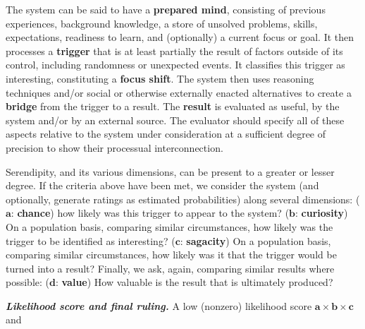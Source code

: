 
\begin{description}[itemsep=16pt]
\item[{(\textbf{A - Definitional characteristics})}] {The system can
  be said to have a {\textbf{prepared mind}}, consisting of previous
  experiences, background knowledge, a store of unsolved problems,
  skills, expectations, readiness to learn, and (optionally) a current
  focus or goal.  It then processes a {\textbf{trigger}} that is at
  least partially the result of factors outside of its control,
  including randomness or unexpected events.  It classifies this
  trigger as interesting, constituting a {\textbf{focus shift}}.  The
  system then uses reasoning techniques and/or social or otherwise
  externally enacted alternatives to create a {\textbf{bridge}} from
  the trigger to a result.  The {\textbf{result}} is evaluated as
  useful, by the system and/or by an external source.}  The evaluator
  should specify all of these aspects relative to the system under
  consideration at a sufficient degree of precision to show their
  processual interconnection.
\item[{(\textbf{B - Dimensions})}] {Serendipity, and its various
  dimensions, can be present to a greater or lesser degree.  If the
  criteria above have been met, we consider the system (and
  optionally, generate ratings as estimated probabilities) along
  several dimensions:
%
{($\mathbf{a}$: \textbf{chance})} how likely was this trigger to appear to
  the system?
%
{($\mathbf{b}$: \textbf{curiosity})} On a population basis, comparing
similar circumstances, how likely was the trigger to be identified as
interesting?
%
{($\mathbf{c}$: \textbf{sagacity})} On a population basis, comparing
similar circumstances, how likely was it that the trigger would be
turned into a result?
%
Finally, we ask, again, comparing similar results where possible:
{($\mathbf{d}$: \textbf{value})} How valuable is the result that
is ultimately produced?}
%
\begin{mdframed}
\vspace{.1cm} {\textbf{\emph{Likelihood score and final ruling.}} A low (nonzero) likelihood score $\mathbf{a}\times\mathbf{b}\times\mathbf{c}$ and
}
\end{mdframed}
\end{description}
